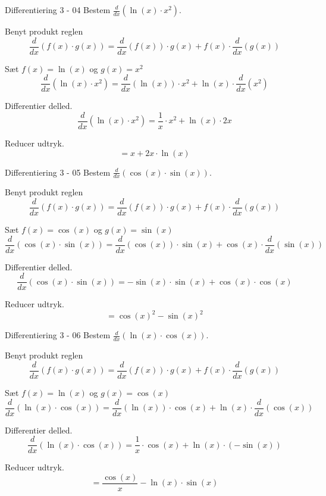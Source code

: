 \documentclass{article}
\begin{document}
\begin{exercise}{Differentiering 3 - 04}
	Bestem $\frac{d}{dx} \left( \ln(x) \cdot x^2 \right)$.
	
	
	\hint
	Benyt produkt reglen
	\[
	\frac{d}{dx} \left( f(x) \cdot g(x) \right) = \frac{d}{dx} \left( f(x) \right) \cdot g(x) + f(x) \cdot \frac{d}{dx} \left( g(x) \right)
	\]
	
	\hint
	Sæt $f(x) = \ln(x)$ og $g(x) = x^2$
	\[
	\frac{d}{dx} \left( \ln(x) \cdot x^2  \right) = \frac{d}{dx} \left( \ln(x) \right) \cdot x^2 + \ln(x) \cdot \frac{d}{dx} \left( x^2 \right)
	\]
	
	\hint
	Differentier delled.
	\[
	\frac{d}{dx} \left( \ln(x) \cdot x^2 \right) = \frac{1}{x} \cdot x^2 + \ln(x) \cdot 2x 
	\]
	
	\hint
	Reducer udtryk.
	\[
	= x + 2x \cdot \ln(x)
	\]
\end{exercise}


\begin{exercise}{Differentiering 3 - 05}
	Bestem $\frac{d}{dx} \left( \cos(x) \cdot \sin(x) \right)$.
	
	
	\hint
	Benyt produkt reglen
	\[
	\frac{d}{dx} \left( f(x) \cdot g(x) \right) = \frac{d}{dx} \left( f(x) \right) \cdot g(x) + f(x) \cdot \frac{d}{dx} \left( g(x) \right)
	\]
	
	\hint
	Sæt $f(x) = \cos(x)$ og $g(x) = \sin(x)$
	\[
	\frac{d}{dx} \left( \cos(x) \cdot \sin(x) \right) = \frac{d}{dx} \left( \cos(x) \right) \cdot \sin(x) + \cos(x) \cdot \frac{d}{dx} \left( \sin(x) \right)
	\]
	
	\hint
	Differentier delled.
	\[
	\frac{d}{dx} \left( \cos(x) \cdot \sin(x) \right) = - \sin(x) \cdot \sin(x) + \cos(x) \cdot \cos(x)
	\]
	
	\hint
	Reducer udtryk.
	\[
	= \cos(x)^2 - \sin(x)^2	
	\]
	
	
\end{exercise}


\begin{exercise}{Differentiering 3 - 06}
	Bestem $\frac{d}{dx} \left( \ln(x) \cdot \cos(x) \right)$.
	
	
	\hint
	Benyt produkt reglen
	\[
	\frac{d}{dx} \left( f(x) \cdot g(x) \right) = \frac{d}{dx} \left( f(x) \right) \cdot g(x) + f(x) \cdot \frac{d}{dx} \left( g(x) \right)
	\]
	
	\hint
	Sæt $f(x) = \ln(x)$ og $g(x) = \cos(x)$
	\[
	\frac{d}{dx} \left( \ln(x) \cdot \cos(x) \right) = \frac{d}{dx} \left( \ln(x) \right) \cdot \cos(x) + \ln(x) \cdot \frac{d}{dx} \left( \cos(x) \right)
	\]
	
	\hint
	Differentier delled.
	\[
	\frac{d}{dx} \left( \ln(x) \cdot \cos(x) \right) = \frac{1}{x} \cdot \cos(x) + \ln(x) \cdot( - \sin(x) )
	\]
	
	\hint 
	Reducer udtryk.
	\[
	= \frac{\cos(x)}{x} - \ln(x) \cdot \sin(x) 
	\]

\end{exercise}
\end{document}
